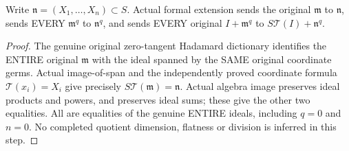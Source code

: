 \begin{theorem}
\label{hir:actual-original-formal-variable-power-extension}
\leanok
Write $\mathfrak n=(X_1,\ldots,X_n)\subset S$. Actual formal extension
sends the original $\mathfrak m$ to $\mathfrak n$, sends EVERY
$\mathfrak m^q$ to $\mathfrak n^q$, and sends EVERY original
$I+\mathfrak m^q$ to $S\mathcal T(I)+\mathfrak n^q$.
\end{theorem}
\begin{proof}
The genuine original zero-tangent Hadamard dictionary identifies the
ENTIRE original $\mathfrak m$ with the ideal spanned by the SAME original
coordinate germs. Actual image-of-span and the independently proved
coordinate formula $\mathcal T(x_i)=X_i$ give precisely
$S\mathcal T(\mathfrak m)=\mathfrak n$. Actual algebra image preserves
ideal products and powers, and preserves ideal sums; these give the other
two equalities. All are equalities of the genuine ENTIRE ideals, including
$q=0$ and $n=0$. No completed quotient dimension, flatness or division is
inferred in this step.
\end{proof}
